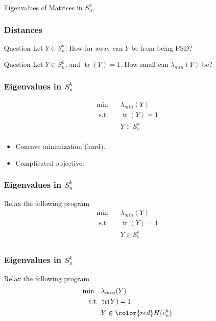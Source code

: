 \documentclass{beamer}
\DeclareMathOperator{\tr}{tr}
\newcommand{\st}{{\text{ s.t. }}}
\begin{document}
\begin{frame}
    \centering
    \huge
    {\color{gray}Eigenvalues of Matrices in $S^k_n$.}
\end{frame}
\begin{frame}
    \frametitle{Distances}
    \begin{block}{Question}
        Let $Y \in S^k_n$. How far away can $Y$ be from being PSD?
    \end{block}
    \pause
    \begin{block}{Question}
        Let $Y \in S^k_n$, and $\tr(Y)=1$. How small can $\lambda_{min}(Y)$ be?
    \end{block}
\end{frame}
\begin{frame}
    \frametitle{Eigenvalues in $S^k_n$}
    \begin{equation*}
        \begin{aligned}
            \min\quad & \lambda_{min}(Y)\\
            \st & \tr(Y) = 1\\
                & Y \in S^k_n\\
        \end{aligned}
    \end{equation*}
    \pause
    \begin{itemize}
        \item Concave minimization (hard).
        \pause
        \item Complicated objective.
    \end{itemize}
\end{frame}
\begin{frame}
    \frametitle{Eigenvalues in $S^k_n$}
    Relax the following program
    \begin{equation*}
        \begin{aligned}
            \min\quad & \lambda_{min}(Y)\\
            \st & \tr(Y) = 1\\
                & Y \in S^k_n\\
        \end{aligned}
    \end{equation*}
\end{frame}
\begin{frame}
    \frametitle{Eigenvalues in $S^k_n$}
    Relax the following program
    \begin{equation*}
        \begin{aligned}
            \min\quad & \lambda_{min}(Y)\\
            \st & \tr(Y) = 1\\
                & Y \in {\color{red}H(c_n^k)}\\
        \end{aligned}
    \end{equation*}
\end{frame}
\end{document}
